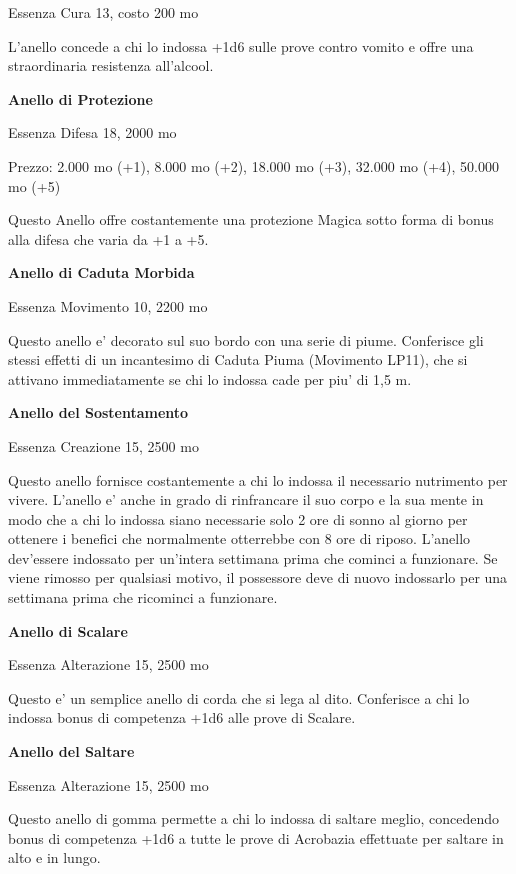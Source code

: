 \documentclass[a4paper,11pt,twoside,openany]{book}
\begin{document}
{		Essenza Cura 13, costo 200 mo
		
		L'anello concede a chi lo indossa +1d6 sulle prove contro vomito e offre una straordinaria resistenza all'alcool.
		
		\textbf{Anello di Protezione}
		
		Essenza Difesa 18, 2000 mo
		
		Prezzo: 2.000 mo (+1), 8.000 mo (+2), 18.000 mo (+3), 32.000 mo (+4),
		50.000 mo (+5)
		
		Questo Anello offre costantemente una protezione Magica sotto forma di bonus alla difesa che varia da +1 a +5.
		
		\textbf{Anello di Caduta Morbida}
		
		Essenza Movimento 10, 2200 mo
		
		Questo anello e' decorato sul suo bordo con una serie di piume. Conferisce gli stessi effetti di un incantesimo di Caduta Piuma (Movimento LP11), che si attivano immediatamente se chi lo indossa cade per piu' di 1,5 m. 
		
		\textbf{Anello del Sostentamento}
		
		Essenza Creazione 15, 2500 mo
		
		Questo anello fornisce costantemente a chi lo indossa il necessario nutrimento per vivere. L'anello e' anche in grado di rinfrancare il suo corpo e la sua mente in modo che a chi lo indossa siano necessarie solo 2 ore di sonno al giorno per ottenere i benefici che normalmente otterrebbe con 8 ore di riposo. L'anello dev'essere indossato per un'intera settimana prima che cominci a funzionare. Se viene rimosso per qualsiasi motivo, il possessore deve di nuovo indossarlo per una settimana prima che ricominci a funzionare.
		
		\textbf{Anello di Scalare}
		
		Essenza Alterazione 15, 2500 mo
		
		Questo e' un semplice anello di corda che si lega al dito. Conferisce a chi lo indossa bonus di competenza +1d6 alle prove di Scalare.
		
		\textbf{Anello del Saltare}
		
		Essenza Alterazione 15, 2500 mo
		
		Questo anello di gomma permette a chi lo indossa di saltare meglio, concedendo bonus di competenza +1d6 a tutte le prove di Acrobazia effettuate per saltare in alto e in lungo.
		
}
\end{document}
